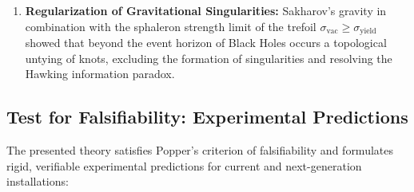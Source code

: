 \documentclass[12pt,a4paper]{article}
\begin{document}
\begin{enumerate}
			\item \textbf{Regularization of Gravitational Singularities:} Sakharov's gravity in combination with the sphaleron strength limit of the trefoil $\sigma_{\text{vac}} \ge \sigma_{\text{yield}}$ showed that beyond the event horizon of Black Holes occurs a topological untying of knots, excluding the formation of singularities and resolving the Hawking information paradox.
		\end{enumerate}
		
		\subsection{Test for Falsifiability: Experimental Predictions}
		The presented theory satisfies Popper's criterion of falsifiability and formulates rigid, verifiable experimental predictions for current and next-generation installations:
		
\end{document}
